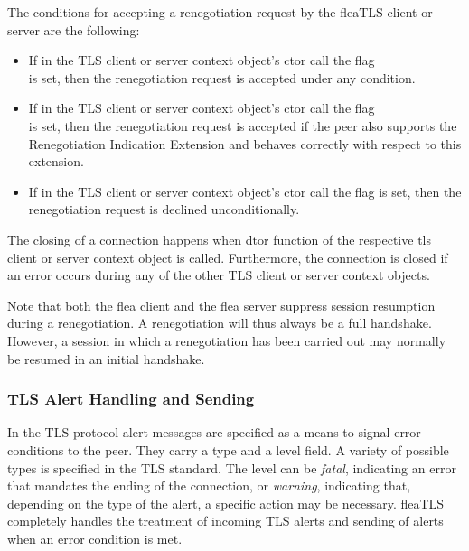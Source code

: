 \documentclass[a4paper,11pt]{scrartcl}
\begin{document}
  The conditions for accepting a renegotiation request by the  fleaTLS client or
  server are the following:
  \begin{itemize}
    \item If in the TLS client or server context object's ctor call the flag \\ is
      set, then the renegotiation request is accepted under any condition.
    \item If in the TLS client or server context object's ctor call the flag \\ is
      set, then the renegotiation request is accepted if the peer also supports
      the Renegotiation Indication Extension and behaves correctly with respect
      to this extension.
      \item If in the TLS client or server context object's ctor call the flag  is
      set, then the renegotiation request is declined unconditionally.
  \end{itemize}

  The closing of a connection happens when dtor function of the respective tls
  client or server context object is called. Furthermore, the connection is
  closed if an error occurs during any of the other TLS client or server context
  objects.

  Note that both the flea client and the flea server suppress session resumption
  during a renegotiation. A renegotiation will thus always be a full handshake.
  However, a session in which a renegotiation has been carried out may normally
  be resumed in an initial handshake.
  

  \subsubsection{TLS Alert Handling and Sending }

  In the TLS protocol alert messages are specified as a means to signal error
  conditions to the peer. They carry a type and a level field. A variety of possible types
  is specified in the TLS standard. The level can be \emph{fatal}, indicating an error
  that mandates the ending of the connection, or \emph{warning}, indicating that,
  depending on the type of the alert, a specific action may be necessary.
  fleaTLS completely handles the treatment of incoming
  TLS alerts and sending of alerts when an error condition is met.
\end{document}
